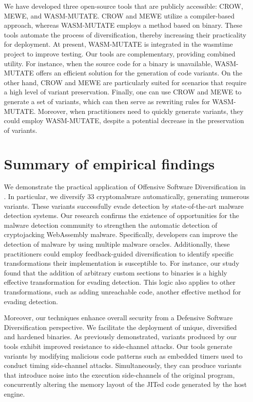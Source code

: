 We have developed three open-source tools that are publicly accessible: CROW, MEWE, and WASM-MUTATE. 
CROW and MEWE utilize a compiler-based approach, whereas WASM-MUTATE employs a method based on binary. 
These tools automate the process of diversification, thereby increasing their practicality for deployment. 
At present, WASM-MUTATE is integrated in the wasmtime project to improve testing. 
Our tools are complementary, providing combined utility. 
For instance, when the source code for a \Wasm binary is unavailable, WASM-MUTATE offers an efficient solution for the generation of code variants. 
On the other hand, CROW and MEWE are particularly suited for scenarios that require a high level of variant preservation.
Finally, one can use CROW and MEWE to generate a set of variants, which can then serve as rewriting rules for WASM-MUTATE. 
Moreover, when practitioners need to quickly generate variants, they could employ WASM-MUTATE, despite a potential decrease in the preservation of variants.


 

\section{Summary of empirical findings}

We demonstrate the practical application of Offensive Software Diversification in \Wasm.
In particular, we diversify 33 \Wasm cryptomalware automatically, generating numerous variants.
These variants successfully evade detection by state-of-the-art malware detection systems.
Our research confirms the existence of opportunities for the malware detection community to strengthen the automatic detection of cryptojacking WebAssembly malware.
Specifically, developers can improve the detection of \Wasm malware by using multiple malware oracles.
Additionally, these practitioners could employ feedback-guided diversification to identify specific transformations their implementation is susceptible to.
For instance, our study found that the addition of arbitrary custom sections to \Wasm binaries is a highly effective transformation for evading detection.
This logic also applies to other transformations, such as adding unreachable code, another effective method for evading detection.

Moreover, our techniques enhance overall security from a Defensive Software Diversification perspective.
We facilitate the deployment of unique, diversified and hardened \Wasm binaries.
As previously demonstrated, \Wasm variants produced by our tools exhibit improved resistance to side-channel attacks.
Our tools generate variants by modifying malicious code patterns such as embedded timers used to conduct timing side-channel attacks.
Simultaneously, they can produce variants that introduce noise into the execution side-channels of the original program, concurrently altering the memory layout of the JITed code generated by the host engine.

